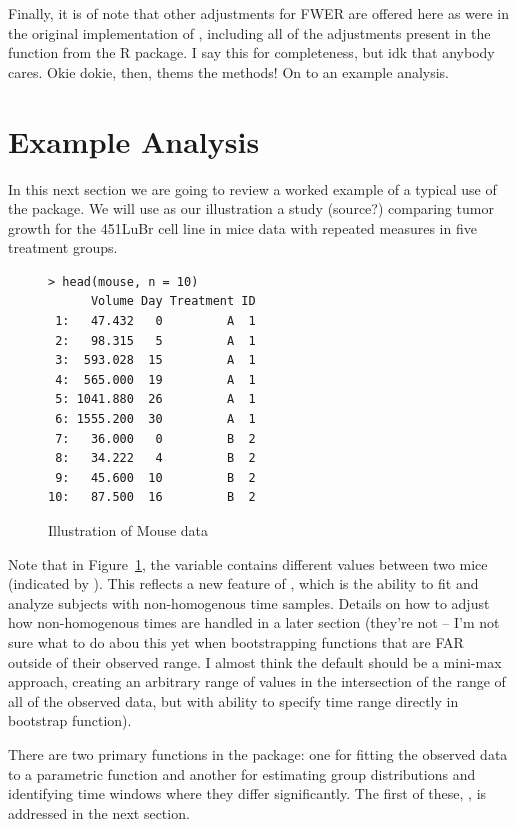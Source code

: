 Finally, it is of note that other adjustments for FWER are offered here as were in the original implementation of , including all of the adjustments present in the  function from the  R package. I say this for completeness, but idk that anybody cares. Okie dokie, then, thems the methods! On to an example analysis.


\section{Example Analysis}

In this next section we are going to review a worked example of a typical use of the  package. We will use as our illustration a study (source?) comparing tumor growth for the 451LuBr cell line in mice data with repeated measures in five treatment groups.

\begin{singlespace}
\begin{figure}
\centering
\begin{BVerbatim}
> head(mouse, n = 10)
      Volume Day Treatment ID
 1:   47.432   0         A  1
 2:   98.315   5         A  1
 3:  593.028  15         A  1
 4:  565.000  19         A  1
 5: 1041.880  26         A  1
 6: 1555.200  30         A  1
 7:   36.000   0         B  2
 8:   34.222   4         B  2
 9:   45.600  10         B  2
10:   87.500  16         B  2
\end{BVerbatim}
\caption{Illustration of Mouse data}
\label{fig:mouse_head}
\end{figure}
\end{singlespace}

Note that in Figure~\ref{fig:mouse_head}, the  variable contains different values between two mice (indicated by ). This reflects a new feature of , which is the ability to fit and analyze subjects with non-homogenous time samples. Details on how to adjust how non-homogenous times are handled in a later section (they're not -- I'm not sure what to do abou this yet when bootstrapping functions that are FAR outside of their observed range. I almost think the default should be a mini-max approach, creating an arbitrary range of values in the intersection of the range of all of the observed data, but with ability to specify time range directly in bootstrap function).

There are two primary functions in the  package: one for fitting the observed data to a parametric function and another for estimating group distributions and identifying time windows where they differ significantly. The first of these, , is addressed in the next section.


